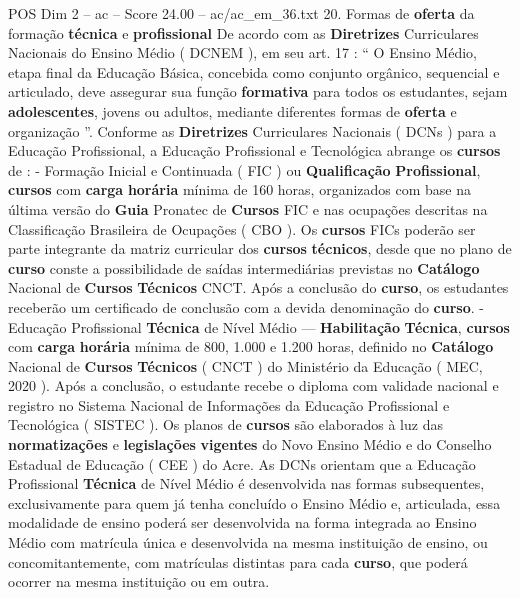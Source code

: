 \begin{textsample}{POS Dim 2 – ac – Score 24.00 – ac/ac\_em\_36.txt}  \label{ex:f2_pos_167}
20.
Formas de \textbf{oferta} da formação \textbf{técnica} e \textbf{profissional} De acordo com as \textbf{Diretrizes} Curriculares Nacionais do Ensino Médio ( DCNEM ), em seu art. 17 : “ O Ensino Médio, etapa final da Educação Básica, concebida como conjunto orgânico, sequencial e articulado, deve assegurar sua função \textbf{formativa} para todos os estudantes, sejam \textbf{adolescentes}, jovens ou adultos, mediante diferentes formas de \textbf{oferta} e organização ”.
Conforme as \textbf{Diretrizes} Curriculares Nacionais ( DCNs ) para a Educação Profissional, a Educação Profissional e Tecnológica abrange os \textbf{cursos} de : - Formação Inicial e Continuada ( FIC ) ou \textbf{Qualificação} \textbf{Profissional}, \textbf{cursos} com \textbf{carga} \textbf{horária} mínima de 160 horas, organizados com base na última versão do \textbf{Guia} Pronatec de \textbf{Cursos} FIC e nas ocupações descritas na Classificação Brasileira de Ocupações ( CBO ).
Os \textbf{cursos} FICs poderão ser parte integrante da matriz curricular dos \textbf{cursos} \textbf{técnicos}, desde que no plano de \textbf{curso} conste a possibilidade de saídas intermediárias previstas no \textbf{Catálogo} Nacional de \textbf{Cursos} \textbf{Técnicos} CNCT.
Após a conclusão do \textbf{curso}, os estudantes receberão um certificado de conclusão com a devida denominação do \textbf{curso}. - Educação Profissional \textbf{Técnica} de Nível Médio — \textbf{Habilitação} \textbf{Técnica}, \textbf{cursos} com \textbf{carga} \textbf{horária} mínima de 800, 1.000 e 1.200 horas, definido no \textbf{Catálogo} Nacional de \textbf{Cursos} \textbf{Técnicos} ( CNCT ) do Ministério da Educação ( MEC, 2020 ).
Após a conclusão, o estudante recebe o diploma com validade nacional e registro no Sistema Nacional de Informações da Educação Profissional e Tecnológica ( SISTEC ).
Os planos de \textbf{cursos} são elaborados à luz das \textbf{normatizações} e \textbf{legislações} \textbf{vigentes} do Novo Ensino Médio e do Conselho Estadual de Educação ( CEE ) do Acre.
As DCNs orientam que a Educação Profissional \textbf{Técnica} de Nível Médio é desenvolvida nas formas subsequentes, exclusivamente para quem já tenha concluído o Ensino Médio e, articulada, essa modalidade de ensino poderá ser desenvolvida na forma integrada ao Ensino Médio com matrícula única e desenvolvida na mesma instituição de ensino, ou concomitantemente, com matrículas distintas para cada \textbf{curso}, que poderá ocorrer na mesma instituição ou em outra.

\end{textsample}
